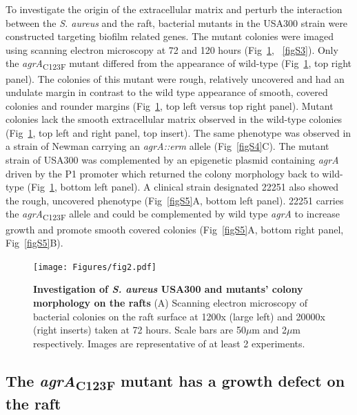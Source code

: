 \documentclass[10pt,letterpaper]{article}
\begin{document}
To investigate the origin of the extracellular matrix and perturb the interaction between the \textit{S. aureus} and the raft, bacterial mutants in the USA300 strain were constructed targeting biofilm related genes.
The mutant colonies were imaged using scanning electron microscopy at 72 and 120 hours (Fig~\ref{fig2}, ~\ref{figS3}).
Only the \textit{agrA}\textsubscript{C123F} mutant differed from the appearance of wild-type (Fig~\ref{fig2}, top right panel).
The colonies of this mutant were rough, relatively uncovered and had an undulate margin in contrast to the wild type appearance of smooth, covered colonies and rounder margins (Fig~\ref{fig2}, top left versus top right panel).
Mutant colonies lack the smooth extracellular matrix observed in the wild-type colonies (Fig~\ref{fig2}, top left and right panel, top insert).
The same phenotype was observed in a strain of Newman carrying an \textit{agrA::erm} allele (Fig~\ref{figS4}C).
The mutant strain of USA300 was complemented by an epigenetic plasmid containing \textit{agrA} driven by the P1 promoter which returned the colony morphology back to wild-type (Fig~\ref{fig2}, bottom left panel).
A clinical strain designated 22251 also showed the rough, uncovered phenotype (Fig~\ref{figS5}A, bottom left panel).
22251 carries the \textit{agrA}\textsubscript{C123F} allele and could be complemented by wild type \textit{agrA} to increase growth and promote smooth covered colonies (Fig~\ref{figS5}A, bottom right panel, Fig~\ref{figS5}B).


\begin{figure}[!ht]
\begin{adjustwidth}{-2.25in}{0in}
\texttt{[image: Figures/fig2.pdf]}
\caption[Investigation of \textit{S. aureus} USA300 and mutants' colony morphology on the rafts]{
	\textbf{Investigation of \textit{S. aureus} USA300 and mutants' colony morphology on the rafts}
	(A) Scanning electron microscopy of bacterial colonies on the raft surface at 1200x (large left) and 20000x (right inserts) taken at 72 hours. Scale bars are 50$\mu$m and 2$\mu$m respectively. Images are representative of at least 2 experiments.}
    \label{fig2}
    \end{adjustwidth}
\end{figure}

\subsection*{The \textit{agrA}\textsubscript{C123F} mutant has a growth defect on the raft}
\end{document}
